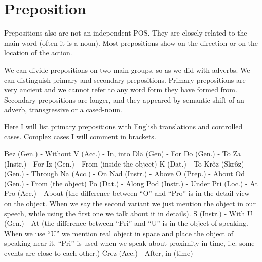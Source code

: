 \section{Preposition}

Prepositions also are not an independent POS. They are closely related to the main word (often it is a noun). Most prepositions show on the direction or on the location of the action. 

We can divide prepositions on two main groups, so as we did with adverbs. We can distinguish primary and secondary prepositions. Primary prepositions are very ancient and we cannot refer to any word form they have formed from. Secondary prepositions are longer, and they appeared by semantic shift of an adverb, transgressive or a cased-noun. 

Here I will list primary prepositions with English translations and controlled cases. Complex cases I will comment in brackets.

Bez (Gen.) - Without
V (Acc.) - In, into
Dlä (Gen) - For
Do (Gen.) - To
Za (Instr.) - For
Iz (Gen.) - From (inside the object)
K (Dat.) - To
Krôz (Skrôz) (Gen.) - Through
Na (Acc.) - On
Nad (Instr.) - Above
O (Prep.) - About
Od (Gen.) - From (the object)
Po (Dat.) - Along
Pod (Instr.) - Under
Pri (Loc.) - At
Pro (Acc.) - About (the difference between “O” and “Pro” is in the detail view on the object. When we say the second variant we just mention the object in our speech, while using the first one we talk about it in details).
S (Instr.) - With
U (Gen.) - At (the difference between “Pri” and “U” is in the object of speaking. When we use “U” we mention real object in space and place the object of speaking near it. “Pri” is used when we speak about proximity in time, i.e. some events are close to each other.)
Črez (Acc.) - After,  in (time)
